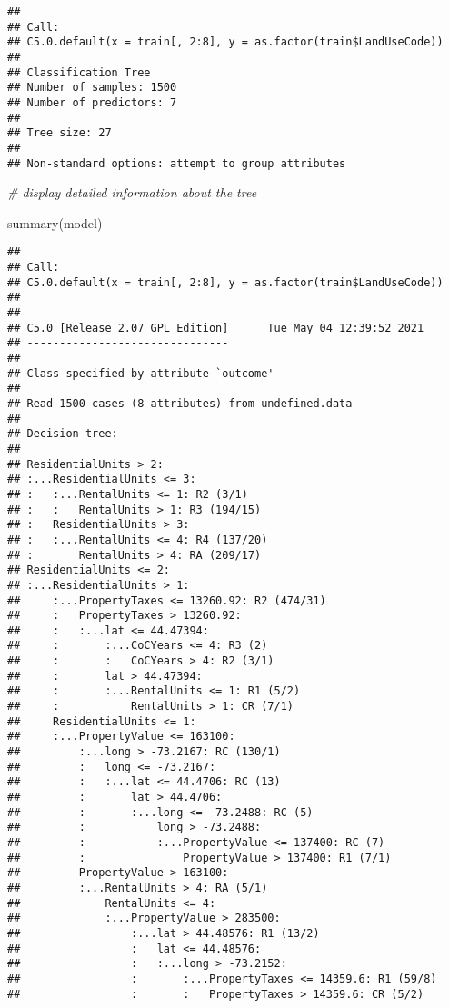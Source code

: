 \documentclass[
]{article}
\newenvironment{Shaded}{\begin{snugshade}}{\end{snugshade}}
\newcommand{\CommentTok}[1]{\textcolor[rgb]{0.56,0.35,0.01}{\textit{#1}}}
\newcommand{\FunctionTok}[1]{\textcolor[rgb]{0.00,0.00,0.00}{#1}}
\newcommand{\NormalTok}[1]{#1}
\begin{document}
\begin{verbatim}
## 
## Call:
## C5.0.default(x = train[, 2:8], y = as.factor(train$LandUseCode))
## 
## Classification Tree
## Number of samples: 1500 
## Number of predictors: 7 
## 
## Tree size: 27 
## 
## Non-standard options: attempt to group attributes
\end{verbatim}

\begin{Shaded}
\begin{Highlighting}[]
\CommentTok{\# display detailed information about the tree}

\FunctionTok{summary}\NormalTok{(model)}
\end{Highlighting}
\end{Shaded}

\begin{verbatim}
## 
## Call:
## C5.0.default(x = train[, 2:8], y = as.factor(train$LandUseCode))
## 
## 
## C5.0 [Release 2.07 GPL Edition]      Tue May 04 12:39:52 2021
## -------------------------------
## 
## Class specified by attribute `outcome'
## 
## Read 1500 cases (8 attributes) from undefined.data
## 
## Decision tree:
## 
## ResidentialUnits > 2:
## :...ResidentialUnits <= 3:
## :   :...RentalUnits <= 1: R2 (3/1)
## :   :   RentalUnits > 1: R3 (194/15)
## :   ResidentialUnits > 3:
## :   :...RentalUnits <= 4: R4 (137/20)
## :       RentalUnits > 4: RA (209/17)
## ResidentialUnits <= 2:
## :...ResidentialUnits > 1:
##     :...PropertyTaxes <= 13260.92: R2 (474/31)
##     :   PropertyTaxes > 13260.92:
##     :   :...lat <= 44.47394:
##     :       :...CoCYears <= 4: R3 (2)
##     :       :   CoCYears > 4: R2 (3/1)
##     :       lat > 44.47394:
##     :       :...RentalUnits <= 1: R1 (5/2)
##     :           RentalUnits > 1: CR (7/1)
##     ResidentialUnits <= 1:
##     :...PropertyValue <= 163100:
##         :...long > -73.2167: RC (130/1)
##         :   long <= -73.2167:
##         :   :...lat <= 44.4706: RC (13)
##         :       lat > 44.4706:
##         :       :...long <= -73.2488: RC (5)
##         :           long > -73.2488:
##         :           :...PropertyValue <= 137400: RC (7)
##         :               PropertyValue > 137400: R1 (7/1)
##         PropertyValue > 163100:
##         :...RentalUnits > 4: RA (5/1)
##             RentalUnits <= 4:
##             :...PropertyValue > 283500:
##                 :...lat > 44.48576: R1 (13/2)
##                 :   lat <= 44.48576:
##                 :   :...long > -73.2152:
##                 :       :...PropertyTaxes <= 14359.6: R1 (59/8)
##                 :       :   PropertyTaxes > 14359.6: CR (5/2)

\end{verbatim}
\end{document}
